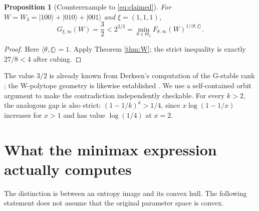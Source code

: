 \documentclass[11pt,a4paper]{article}
\newtheorem{proposition}[theorem]{Proposition}
\newcommand{\ket}[1]{|#1\rangle}
\begin{document}
\begin{proposition}[Counterexample to \eqref{eq:claimed}]\label{prop:counter}
For \(W=W_3=\ket{100}+\ket{010}+\ket{001}\) and \(\xi=(1,1,1)\),
\[
 G_{\xi,\infty}(W)=\frac32
 <2^{2/3}
 =\min_{\theta\in\Theta_3}F_{\theta,\infty}(W)^{1/\langle\theta,\xi\rangle}.
\]
\end{proposition}
\begin{proof}
Here \(\langle\theta,\xi\rangle=1\). Apply Theorem \ref{thm:W};
the strict inequality is exactly \(27/8<4\) after cubing.
\end{proof}

The value \(3/2\) is already known from Derksen's computation of the
G-stable rank \cite{Derksen}; the W-polytope geometry is likewise
established \cite{Walter}. We use a self-contained orbit argument to
make the contradiction independently checkable. For every \(k>2\),
the analogous gap is also strict: \((1-1/k)^k>1/4\), since
\(x\log(1-1/x)\) increases for \(x>1\) and has value \(\log(1/4)\)
at \(x=2\).

\section{What the minimax expression actually computes}
The distinction is between an entropy image and its convex hull.
The following statement does not assume that the original parameter
space is convex.
\end{document}
